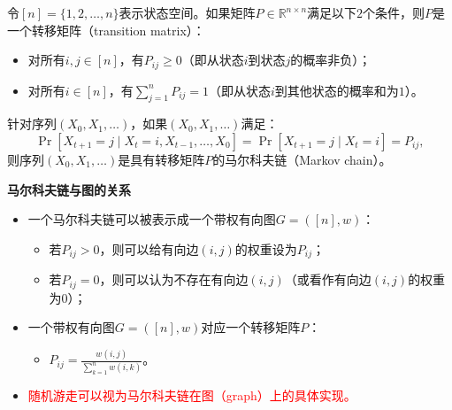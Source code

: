 \begin{definition}[转移矩阵]
    \label{defn:transition-matrix}
    令$[n]=\{1,2,\dots,n\}$表示状态空间。如果矩阵$P\in\mathbb{R}^{n\times n}$满足以下$2$个条件，则$P$是一个转移矩阵（transition matrix）：
    \begin{itemize}
        \item 对所有$i,j\in [n]$，有$P_{ij}\ge 0$（即从状态$i$到状态$j$的概率非负）；
            
        \item 对所有$i\in[n]$，有$\sum_{j=1}^n{P_{ij}}=1$（即从状态$i$到其他状态的概率和为$1$）。
    \end{itemize}
\end{definition}

\begin{definition}[马尔科夫链]
    \label{defn:markov-chains}
    针对序列$(X_0,X_1,\dots)$，如果$(X_0,X_1,\dots)$满足：
    \[
        \Pr[X_{t+1}=j\mid X_t=i,X_{t-1},\dots,X_0]=\Pr[X_{t+1}=j\mid X_t=i]=P_{ij},
    \]
    则序列$(X_0,X_1,\dots)$是具有转移矩阵$P$的马尔科夫链（Markov chain）。
\end{definition}

\textbf{马尔科夫链与图的关系}

\begin{itemize}
    \item 一个马尔科夫链可以被表示成一个带权有向图$G=([n],w)$：
        \begin{itemize}
            \item 若$P_{ij}>0$，则可以给有向边$(i,j)$的权重设为$P_{ij}$；
            \item 若$P_{ij}=0$，则可以认为不存在有向边$(i,j)$（或看作有向边$(i,j)$的权重为$0$）；
        \end{itemize}
    \item 一个带权有向图$G=([n],w)$对应一个转移矩阵$P$：
        \begin{itemize}
            \item $P_{ij}=\frac{w(i,j)}{\sum_{k=1}^n{w(i,k)}}$。
        \end{itemize}
    \item \textcolor{red}{随机游走可以视为马尔科夫链在图（graph）上的具体实现。}
\end{itemize}

